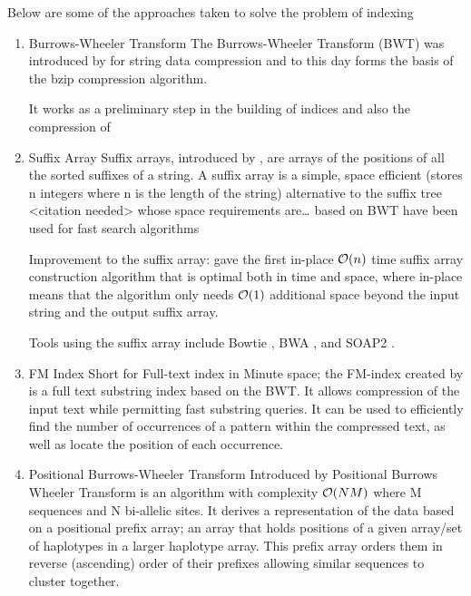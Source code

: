 \documentclass[a4paper]{article}
\begin{document}
Below are some of the approaches taken to solve the problem of indexing
\begin{enumerate}
\item Burrows-Wheeler Transform
\label{sec:org4aeba07}
The Burrows-Wheeler Transform (BWT) was introduced by
\cite{burrowsBlocksortingLosslessData1994} for string data 
compression and to this day forms the basis of the bzip compression algorithm.

It works as a preliminary step in the building of indices and also the 
compression of 

\item Suffix Array
\label{sec:org43799ef}
Suffix arrays, introduced by \cite{manberSuffixArraysNew1990}, are arrays of the
positions of all the sorted suffixes of a string.
A suffix array is a simple, space efficient
(stores n integers where n is the length of the string) alternative to the
suffix tree <citation needed> whose space requirements are\ldots{}
based on BWT have been used for fast search algorithms

Improvement to the suffix array: \cite{liMinimapMiniasmFast2016}
gave the first in-place \(\mathcal{O}(n)\) time suffix array construction algorithm that
is optimal both in time and space, where in-place means that the algorithm only
needs \(\mathcal{O}(1)\) additional space beyond the input string and the output suffix
array.

Tools using the suffix array include Bowtie
\cite{langmeadUltrafastMemoryefficientAlignment2009}, BWA
\cite{liFastAccurateShort2009}, 
and SOAP2 \cite{liSOAP2ImprovedUltrafast2009}.

\item FM Index
\label{sec:org8d61b42}
Short for Full-text index in Minute space; the FM-index created
by \cite{ferraginaOpportunisticDataStructures2000} is a full text substring index
based on the BWT. It allows compression of the input text while permitting fast
substring queries. It can be used to efficiently find the number of occurrences
of a pattern within the compressed text, as well as locate the position of each
occurrence.

\item Positional Burrows-Wheeler Transform
\label{sec:orgd1892b7}
Introduced by \cite{durbinEfficientHaplotypeMatching2014} Positional Burrows 
Wheeler Transform is an algorithm with complexity \(\mathcal{O}(NM)\) where M sequences
and N bi-allelic sites.
It derives a representation of the data based on a positional prefix array; an
array that holds positions of a given array/set of haplotypes in a larger 
haplotype array. This prefix array orders them in reverse (ascending) order of
their prefixes allowing similar sequences to cluster together.


\end{enumerate}
\end{document}
